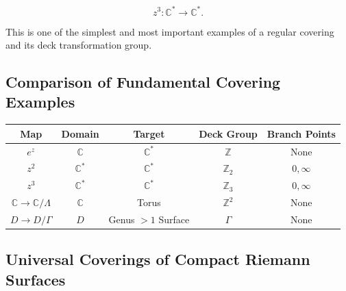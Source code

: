 \documentclass[12pt,a4paper]{article}
\theoremstyle{notespace}
\begin{document}
\[
z^3:\mathbb C^*\to\mathbb C^*.
\]

This is one of the simplest and most important examples of a regular covering and its deck transformation group.

\subsection{Comparison of Fundamental Covering Examples}

\begin{center}
	\renewcommand{\arraystretch}{1.4}
	\begin{tabular}{|c|c|c|c|c|}
		\hline
		Map & Domain & Target & Deck Group & Branch Points\\
		\hline
		\(e^z\) &
		\(\mathbb C\) &
		\(\mathbb C^*\) &
		\(\mathbb Z\) &
		None\\
		\hline
		\(z^2\) &
		\(\mathbb C^*\) &
		\(\mathbb C^*\) &
		\(\mathbb Z_2\) &
		\(0,\infty\)\\
		\hline
		\(z^3\) &
		\(\mathbb C^*\) &
		\(\mathbb C^*\) &
		\(\mathbb Z_3\) &
		\(0,\infty\)\\
		\hline
		\(\mathbb C\to \mathbb C/\Lambda\) &
		\(\mathbb C\) &
		Torus &
		\(\mathbb Z^2\) &
		None\\
		\hline
		\(D\to D/\Gamma\) &
		\(D\) &
		Genus \(>1\) Surface &
		\(\Gamma\) &
		None\\
		\hline
	\end{tabular}
\end{center}
\subsection{Universal Coverings of Compact Riemann Surfaces}

\begin{center}
\end{center}
\end{document}
